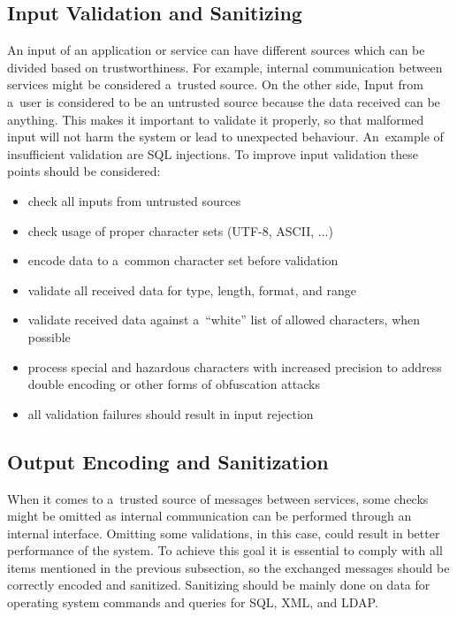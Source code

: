   \subsection*{Input Validation and Sanitizing}
    An input of an application or service can have different sources which can be divided based on trustworthiness.
    For example, internal communication between services might be considered a~trusted source. On the other side,
    Input from a~user is considered to be an untrusted source because the data received can be anything.
    This makes it important to validate it properly, so that malformed input will not harm the system or lead
    to unexpected behaviour. An~example of insufficient validation are SQL injections. To improve input
    validation these points should be considered:
    \begin{itemize}
      \item check all inputs from untrusted sources
      \item check usage of proper character sets (UTF-8, ASCII, ...)
      \item encode data to a~common character set before validation
      \item validate all received data for type, length, format, and range
      \item validate received data against a~``white'' list of allowed characters, when possible
      \item process special and hazardous characters with increased precision to address double encoding or other
            forms of obfuscation attacks
      \item all validation failures should result in input rejection
    \end{itemize}

  \subsection*{Output Encoding and Sanitization}
    When it comes to a~trusted source of messages between services, some checks might be omitted as internal
    communication can be performed through an internal interface. Omitting some validations, in this case,
    could result in better performance of the system. To achieve this goal it is essential to comply with
    all items mentioned in the previous subsection, so the exchanged messages should be correctly encoded
    and sanitized. Sanitizing should be mainly done on data for operating system commands and queries
    for SQL, XML, and LDAP.

